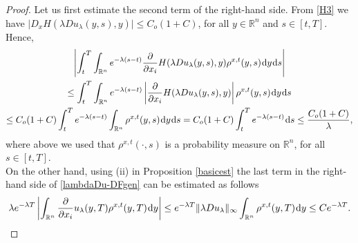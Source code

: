 \documentclass{amsart}
\theoremstyle{remark}
\theoremstyle{definition}
\theoremstyle{Claim}
\newcommand{\R}{\mathbb{R}}
\newcommand{\dd}{\hspace{0.7pt}{\rm d}}
\theoremstyle{plain}
\begin{document}
\begin{proof}
	      Let us first estimate the second term of the right-hand side. From \eqref{H3} we have $\lvert D_x H(\lambda Du_\lambda(y,s),y)\rvert\leq C_o(1+C)$, for all $y\in \mathbb{R}^n$ and $s\in [t,T]$. Hence,
		\begin{multline*}
			\left\lvert\int_{t}^{T}\int_{\R^n}e^{-\lambda (s-t)} \frac{\partial}{\partial x_i} H(\lambda Du_\lambda(y,s),y) \rho^{x,t}(y,s)\dd y\dd s\right\rvert\\\le \int_{t}^{T}\int_{\R^n}e^{-\lambda (s-t)} \left\lvert\frac{\partial}{\partial x_i} H(\lambda Du_\lambda(y,s),y)\right\rvert \rho^{x,t}(y,s)\dd y\dd s\\\le C_o(1+C)\int_{t}^{T}e^{-\lambda (s-t)} \int_{\R^n} \rho^{x,t}(y,s)\dd y\dd s=C_o(1+C)\int_{t}^{T}e^{-\lambda (s-t)}\dd s\leq \frac{C_o(1+C)}{\lambda },
		\end{multline*}
	where above we used that $\rho^{x,t}(\cdot,s)$ is a probability measure on $\mathbb{R}^n$, for all $s\in [t,T]$.
	\smallskip
	\\\indent On the other hand, using (ii) in Proposition \eqref{basicest} the last term in the right-hand side of \eqref{lambdaDu-DFgen} can be estimated as follows
	$$\lambda e^{-\lambda T}\left\lvert\int_{\mathbb{R}^n}\frac{\partial}{\partial x_i}u_\lambda(y,T)\rho^{x, t}(y,T)\dd y\right\rvert\leq e^{-\lambda T}\lVert\lambda Du_\lambda\rVert_\infty\int_{\mathbb{R}^n} \rho^{x, t}(y,T)\dd y\leq Ce^{-\lambda T}.$$
	
	\smallskip
	

\end{proof}
\end{document}
